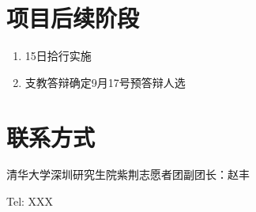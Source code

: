 \documentclass[12pt]{ctexart}
\begin{document}
\section{项目后续阶段}
\begin{enumerate}
\item 15日拾行实施
\item 支教答辩确定9月17号预答辩人选
\end{enumerate}
\section{联系方式}
清华大学深圳研究生院紫荆志愿者团副团长：赵丰

Tel: XXX
\end{document}
